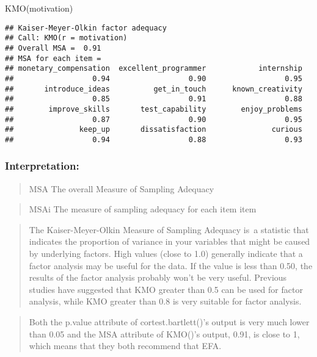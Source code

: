 \documentclass[
]{article}
\newenvironment{Shaded}{\begin{snugshade}}{\end{snugshade}}
\newcommand{\FunctionTok}[1]{\textcolor[rgb]{0.00,0.00,0.00}{#1}}
\newcommand{\NormalTok}[1]{#1}
\begin{document}
\begin{Shaded}
\begin{Highlighting}[]
\FunctionTok{KMO}\NormalTok{(motivation)}
\end{Highlighting}
\end{Shaded}

\begin{verbatim}
## Kaiser-Meyer-Olkin factor adequacy
## Call: KMO(r = motivation)
## Overall MSA =  0.91
## MSA for each item = 
## monetary_compensation  excellent_programmer            internship 
##                  0.94                  0.90                  0.95 
##       introduce_ideas          get_in_touch      known_creativity 
##                  0.85                  0.91                  0.88 
##        improve_skills       test_capability        enjoy_problems 
##                  0.87                  0.90                  0.95 
##               keep_up       dissatisfaction               curious 
##                  0.94                  0.88                  0.93
\end{verbatim}

\hypertarget{interpretation-1}{%
\subsubsection{Interpretation:}\label{interpretation-1}}

\begin{quote}
MSA The overall Measure of Sampling Adequacy
\end{quote}

\begin{quote}
MSAi The measure of sampling adequacy for each item item
\end{quote}

\begin{quote}
The Kaiser-Meyer-Olkin Measure of Sampling Adequacy is~a statistic that
indicates the proportion of variance in your variables that might be
caused by underlying factors. High values (close to 1.0) generally
indicate that a factor analysis may be useful for the data. If the value
is less than 0.50, the results of the factor analysis probably won't be
very useful. Previous studies have suggested that KMO greater than 0.5
can be used for factor analysis, while KMO greater than 0.8 is very
suitable for factor analysis.
\end{quote}

\begin{quote}
Both the p.value attribute of cortest.bartlett()'s output is very much
lower than 0.05 and the MSA attribute of KMO()'s output, 0.91, is close
to 1, which means that they both recommend that EFA.
\end{quote}
\end{document}
